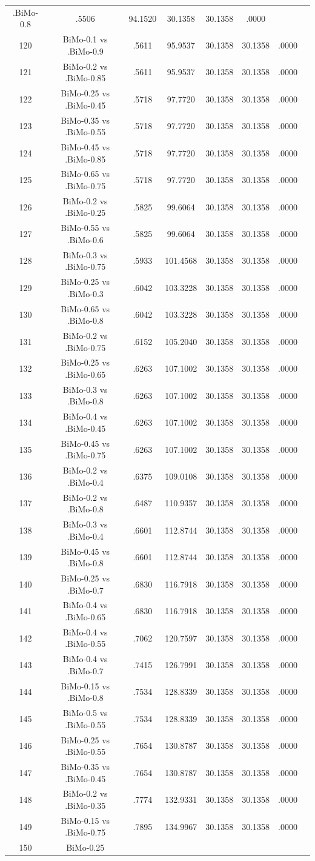 \documentclass[a4paper,10pt]{article}
\begin{document}
\begin{landscape}
\begin{table}[!htp]
\begin{tabular}{cccccccc}
.BiMo-0.8&.5506&94.1520&30.1358&30.1358&.0000\\120&BiMo-0.1 vs .BiMo-0.9&.5611&95.9537&30.1358&30.1358&.0000\\121&BiMo-0.2 vs .BiMo-0.85&.5611&95.9537&30.1358&30.1358&.0000\\122&BiMo-0.25 vs .BiMo-0.45&.5718&97.7720&30.1358&30.1358&.0000\\123&BiMo-0.35 vs .BiMo-0.55&.5718&97.7720&30.1358&30.1358&.0000\\124&BiMo-0.45 vs .BiMo-0.85&.5718&97.7720&30.1358&30.1358&.0000\\125&BiMo-0.65 vs .BiMo-0.75&.5718&97.7720&30.1358&30.1358&.0000\\126&BiMo-0.2 vs .BiMo-0.25&.5825&99.6064&30.1358&30.1358&.0000\\127&BiMo-0.55 vs .BiMo-0.6&.5825&99.6064&30.1358&30.1358&.0000\\128&BiMo-0.3 vs .BiMo-0.75&.5933&101.4568&30.1358&30.1358&.0000\\129&BiMo-0.25 vs .BiMo-0.3&.6042&103.3228&30.1358&30.1358&.0000\\130&BiMo-0.65 vs .BiMo-0.8&.6042&103.3228&30.1358&30.1358&.0000\\131&BiMo-0.2 vs .BiMo-0.75&.6152&105.2040&30.1358&30.1358&.0000\\132&BiMo-0.25 vs .BiMo-0.65&.6263&107.1002&30.1358&30.1358&.0000\\133&BiMo-0.3 vs .BiMo-0.8&.6263&107.1002&30.1358&30.1358&.0000\\134&BiMo-0.4 vs .BiMo-0.45&.6263&107.1002&30.1358&30.1358&.0000\\135&BiMo-0.45 vs .BiMo-0.75&.6263&107.1002&30.1358&30.1358&.0000\\136&BiMo-0.2 vs .BiMo-0.4&.6375&109.0108&30.1358&30.1358&.0000\\137&BiMo-0.2 vs .BiMo-0.8&.6487&110.9357&30.1358&30.1358&.0000\\138&BiMo-0.3 vs .BiMo-0.4&.6601&112.8744&30.1358&30.1358&.0000\\139&BiMo-0.45 vs .BiMo-0.8&.6601&112.8744&30.1358&30.1358&.0000\\140&BiMo-0.25 vs .BiMo-0.7&.6830&116.7918&30.1358&30.1358&.0000\\141&BiMo-0.4 vs .BiMo-0.65&.6830&116.7918&30.1358&30.1358&.0000\\142&BiMo-0.4 vs .BiMo-0.55&.7062&120.7597&30.1358&30.1358&.0000\\143&BiMo-0.4 vs .BiMo-0.7&.7415&126.7991&30.1358&30.1358&.0000\\144&BiMo-0.15 vs .BiMo-0.8&.7534&128.8339&30.1358&30.1358&.0000\\145&BiMo-0.5 vs .BiMo-0.55&.7534&128.8339&30.1358&30.1358&.0000\\146&BiMo-0.25 vs .BiMo-0.55&.7654&130.8787&30.1358&30.1358&.0000\\147&BiMo-0.35 vs .BiMo-0.45&.7654&130.8787&30.1358&30.1358&.0000\\148&BiMo-0.2 vs .BiMo-0.35&.7774&132.9331&30.1358&30.1358&.0000\\149&BiMo-0.15 vs .BiMo-0.75&.7895&134.9967&30.1358&30.1358&.0000\\150&BiMo-0.25 
\end{tabular}
\end{table}
\end{landscape}
\end{document}
